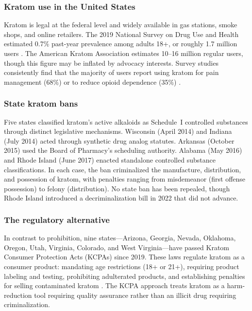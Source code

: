 \documentclass[12pt]{article}
\begin{document}
\subsubsection*{Kratom use in the United States} Kratom is legal at the federal level and widely available in gas stations, smoke shops, and online retailers. The 2019 National Survey on Drug Use and Health estimated 0.7\% past-year prevalence among adults 18+, or roughly 1.7 million users \citep{palamar2021past}. The American Kratom Association estimates 10--16 million regular users, though this figure may be inflated by advocacy interests. Survey studies consistently find that the majority of users report using kratom for pain management (68\%) or to reduce opioid dependence (35\%) \citep{grundmann2017patterns, smith2021self}.

\subsubsection*{State kratom bans} Five states classified kratom's active alkaloids as Schedule~I controlled substances through distinct legislative mechanisms. Wisconsin (April 2014) and Indiana (July 2014) acted through synthetic drug analog statutes. Arkansas (October 2015) used the Board of Pharmacy's scheduling authority. Alabama (May 2016) and Rhode Island (June 2017) enacted standalone controlled substance classifications. In each case, the ban criminalized the manufacture, distribution, and possession of kratom, with penalties ranging from misdemeanor (first offense possession) to felony (distribution). No state ban has been repealed, though Rhode Island introduced a decriminalization bill in 2022 that did not advance.

\subsubsection*{The regulatory alternative} In contrast to prohibition, nine states---Arizona, Georgia, Nevada, Oklahoma, Oregon, Utah, Virginia, Colorado, and West Virginia---have passed Kratom Consumer Protection Acts (KCPAs) since 2019. These laws regulate kratom as a consumer product: mandating age restrictions (18+ or 21+), requiring product labeling and testing, prohibiting adulterated products, and establishing penalties for selling contaminated kratom \citep{grundmann2023kratom}. The KCPA approach treats kratom as a harm-reduction tool requiring quality assurance rather than an illicit drug requiring criminalization.
\end{document}
